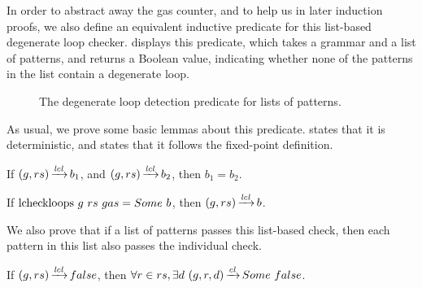 In order to abstract away the gas counter,
and to help us in later induction proofs,
we also define an equivalent inductive predicate
for this list-based degenerate loop checker.
 displays this predicate,
which takes a grammar and a list of patterns,
and returns a Boolean value, indicating
whether none of the patterns in the list
contain a degenerate loop.

\begin{figure}
    \centering
    
    \caption{The degenerate loop detection predicate for lists of patterns.}
    \label{fig:lcheckloops}
\end{figure}

As usual, we prove some basic lemmas
about this predicate.
states that it is
deterministic,
and 
states that it follows
the fixed-point definition.

\begin{lemma}
    \label{lemma:lcheckloops-determinism}
    If $(g,rs) \operatorname{\xrightarrow{\mathit{lcl}}} b_1$,
    and $(g,rs) \operatorname{\xrightarrow{\mathit{lcl}}} b_2$,
    then $b_1=b_2$.
\end{lemma}

\begin{lemma}
    \label{lemma:lcheckloops-follows}
    If $\text{lcheckloops}{}\ g\ rs\ gas = Some\ b$,
    then $(g,rs) \operatorname{\xrightarrow{\mathit{lcl}}} b$.
\end{lemma}

We also prove that if a list of patterns
passes this list-based check,
then each pattern in this list also
passes the individual check.

\begin{lemma}%
    \label{lemma:lcheckloops-safety}
    If $(g,rs) \operatorname{\xrightarrow{\mathit{lcl}}} false$,
    then $\forall r \in rs, \exists d\ \CheckLoops{g}{r}{d}{\Some false}$.
\end{lemma}

